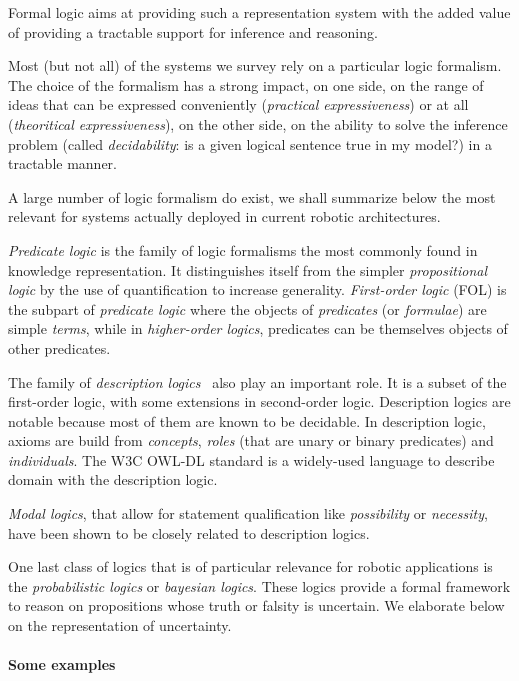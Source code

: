 \documentclass[a4paper, twocolumn]{article}
\begin{document}
Formal logic aims at providing such a representation system with the added
value of providing a tractable support for inference and reasoning.

Most (but not all) of the systems we survey rely on a particular logic
formalism. The choice of the formalism has a strong impact, on one side, on the
range of ideas that can be expressed conveniently (\emph{practical
expressiveness}) or at all (\emph{theoritical expressiveness}), on the other
side, on the ability to solve the inference problem (called
\emph{decidability}: is a given logical sentence true in my model?) in a
tractable manner.

A large number of logic formalism do exist, we shall summarize below the most
relevant for systems actually deployed in current robotic architectures.

\emph{Predicate logic} is the family of logic formalisms the most commonly
found in knowledge representation. It distinguishes itself from the simpler
\emph{propositional logic} by the use of quantification to increase generality.
\emph{First-order logic} (FOL) is the subpart of \emph{predicate logic} where the
objects of \emph{predicates} (or \emph{formulae}) are simple \emph{terms},
while in \emph{higher-order logics}, predicates can be themselves objects of
other predicates.

The family of \emph{description logics}~\cite{Baader2008} also play an
important role. It is a subset of the first-order logic, with some extensions
in second-order logic. Description logics are notable because most of them are
known to be decidable. In description logic, axioms are build from
\emph{concepts}, \emph{roles} (that are unary or binary predicates) and
\emph{individuals}. The W3C OWL-DL standard is a widely-used language to describe
domain with the description logic.

\emph{Modal logics}, that allow for statement qualification
like \emph{possibility} or \emph{necessity}, have been shown to be closely
related to description logics.


One last class of logics that is of particular relevance for robotic
applications is the \emph{probabilistic logics} or \emph{bayesian logics}.
These logics provide a formal framework to reason on propositions whose truth
or falsity is uncertain. We elaborate below on the representation of uncertainty.


\paragraph{Some examples}
\end{document}
